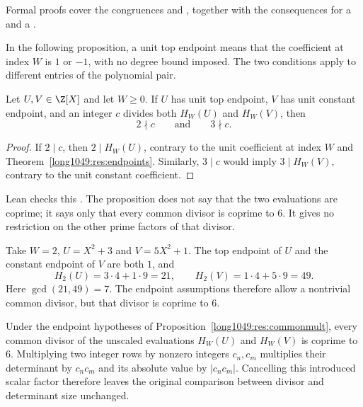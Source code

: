 \noindent Formal proofs cover the congruences
 and
, together with the consequences for a
 and a
.

In the following proposition, a unit top endpoint means that the
coefficient at index $W$ is $1$ or $-1$, with no degree bound imposed.
The two conditions apply to different entries of the polynomial pair.

\begin{proposition}\label{long1049:res:commonmult}
Let \(U,V\in\Z[X]\) and let \(W\ge0\).  If \(U\) has unit top endpoint, \(V\)
has unit constant endpoint, and an integer
\(c\) divides both \(H_W(U)\) and \(H_W(V)\), then
\[
 2\nmid c\qquad\text{and}\qquad 3\nmid c.
\]
\end{proposition}
\begin{proof}
If $2\mid c$, then $2\mid H_W(U)$, contrary to the unit coefficient
at index $W$ and Theorem~\ref{long1049:res:endpoints}. Similarly,
$3\mid c$ would imply $3\mid H_W(V)$, contrary to the unit constant
coefficient.
\end{proof}

\noindent Lean checks this
.  The proposition does not say that the two evaluations are coprime;
it says only that every common divisor is coprime to $6$. It gives
no restriction on the other prime factors of that divisor.

\begin{example}\label{long1049:ex:commonmult}
Take \(W=2\), \(U=X^2+3\) and \(V=5X^2+1\).  The top endpoint of \(U\) and the
constant endpoint of \(V\) are both \(1\), and
\[
 H_2(U)=3\cdot4+1\cdot9=21,\qquad H_2(V)=1\cdot4+5\cdot9=49 .
\]
Here $\gcd(21,49)=7$. The endpoint assumptions therefore allow a
nontrivial common divisor, but that divisor is coprime to $6$.
\end{example}

\begin{corollary}\label{long1049:res:nomult}
Under the endpoint hypotheses of Proposition~\ref{long1049:res:commonmult},
every common divisor of the unscaled evaluations $H_W(U)$ and $H_W(V)$
is coprime to $6$. Multiplying two integer rows by nonzero integers
$c_n,c_m$ multiplies their determinant by $c_nc_m$ and its absolute
value by $|c_nc_m|$. Cancelling this introduced scalar factor therefore
leaves the original comparison between divisor and determinant size
unchanged.
\end{corollary}

